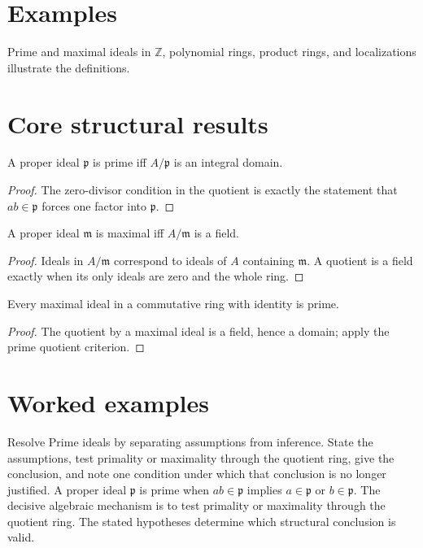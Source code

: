 \section{Examples}
Prime and maximal ideals in $\mathbb Z$, polynomial rings, product rings, and localizations illustrate the definitions.

\section{Core structural results}

\begin{theorem}\label{thm:v02-01}
A proper ideal $\mathfrak p$ is prime iff $A/\mathfrak p$ is an integral domain.
\begin{proof}
The zero-divisor condition in the quotient is exactly the statement that $ab\in\mathfrak p$ forces one factor into $\mathfrak p$.
\end{proof}
\end{theorem}

\begin{theorem}\label{thm:v02-02}
A proper ideal $\mathfrak m$ is maximal iff $A/\mathfrak m$ is a field.
\begin{proof}
Ideals in $A/\mathfrak m$ correspond to ideals of $A$ containing $\mathfrak m$. A quotient is a field exactly when its only ideals are zero and the whole ring.
\end{proof}
\end{theorem}

\begin{theorem}\label{thm:v02-03}
Every maximal ideal in a commutative ring with identity is prime.
\begin{proof}
The quotient by a maximal ideal is a field, hence a domain; apply the prime quotient criterion.
\end{proof}
\end{theorem}

\section{Worked examples}

\begin{example}\label{ex:v02-worked-01}
Resolve Prime ideals by separating assumptions from inference. State the assumptions, test primality or maximality through the quotient ring, give the conclusion, and note one condition under which that conclusion is no longer justified. A proper ideal $\mathfrak p$ is prime when $ab\in\mathfrak p$ implies $a\in\mathfrak p$ or $b\in\mathfrak p$. The decisive algebraic mechanism is to test primality or maximality through the quotient ring. The stated hypotheses determine which structural conclusion is valid.
\end{example}

